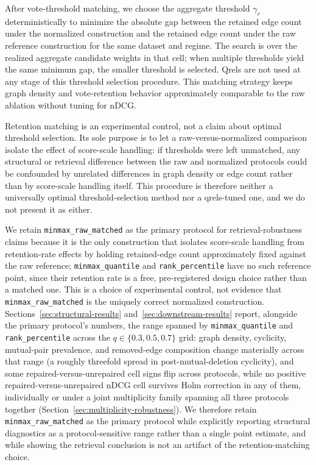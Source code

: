\documentclass[manuscript,anonymous,review]{acmart}
\begin{document}
After vote-threshold matching, we choose the aggregate threshold $\gamma_r$
deterministically to minimize the absolute gap between the retained edge count
under the normalized construction and the retained edge count under the raw
reference construction for the same dataset and regime. The search is over the
realized aggregate candidate weights in that cell; when multiple thresholds
yield the same minimum gap, the smaller threshold is selected. Qrels are not
used at any stage of this threshold selection procedure. This matching
strategy keeps graph density and vote-retention behavior approximately
comparable to the raw ablation without tuning for nDCG.

Retention matching is an experimental control, not a claim about optimal
threshold selection. Its sole purpose is to let a raw-versus-normalized
comparison isolate the effect of score-scale handling: if thresholds were left
unmatched, any structural or retrieval difference between the raw and
normalized protocols could be confounded by unrelated differences in graph
density or edge count rather than by score-scale handling itself. This
procedure is therefore neither a universally optimal threshold-selection
method nor a qrels-tuned one, and we do not present it as either.

We retain \texttt{minmax\_raw\_matched} as the primary protocol for
retrieval-robustness claims because it is the only construction that isolates
score-scale handling from retention-rate effects by holding retained-edge
count approximately fixed against the raw reference; \texttt{minmax\_quantile}
and \texttt{rank\_percentile} have no such reference point, since their
retention rate is a free, pre-registered design choice rather than a matched
one. This is a choice of experimental control, not evidence that
\texttt{minmax\_raw\_matched} is the uniquely correct normalized
construction. Sections~\ref{sec:structural-results}
and~\ref{sec:downstream-results} report, alongside the primary protocol's
numbers, the range spanned by \texttt{minmax\_quantile} and
\texttt{rank\_percentile} across the $q\in\{0.3,0.5,0.7\}$ grid: graph
density, cyclicity, mutual-pair prevalence, and removed-edge composition
change materially across that range (a roughly threefold spread in
post-mutual-deletion cyclicity), and some repaired-versus-unrepaired cell
signs flip across protocols, while no positive repaired-versus-unrepaired
nDCG cell survives Holm correction in any of them, individually or under a
joint multiplicity family spanning all three protocols together
(Section~\ref{sec:multiplicity-robustness}). We therefore retain
\texttt{minmax\_raw\_matched} as the primary protocol while explicitly
reporting structural diagnostics as a protocol-sensitive range rather than a
single point estimate, and while showing the retrieval conclusion is not an
artifact of the retention-matching choice.
\end{document}

